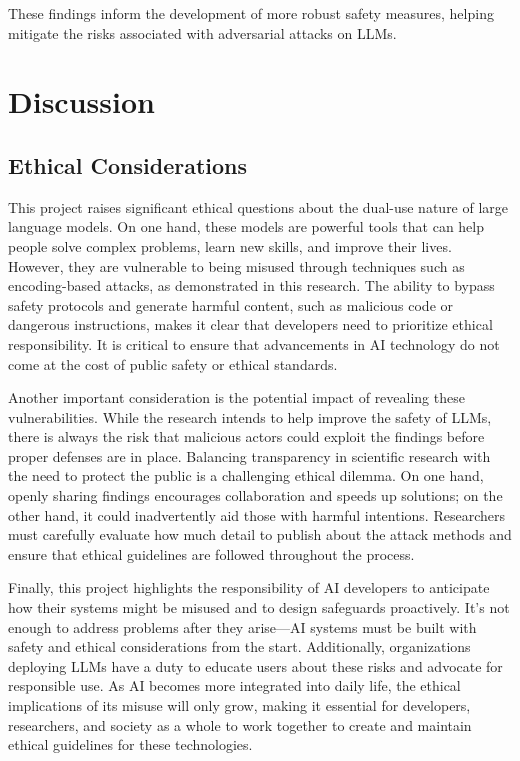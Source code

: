 \documentclass{article} %
\begin{document}
These findings inform the development of more robust safety measures, helping mitigate the risks associated with adversarial attacks on LLMs.

\section{Discussion}
\subsection{Ethical Considerations}
This project raises significant ethical questions about the dual-use nature of large language models. On one hand, these models are powerful tools that can help people solve complex problems, learn new skills, and improve their lives. However, they are vulnerable to being misused through techniques such as encoding-based attacks, as demonstrated in this research. The ability to bypass safety protocols and generate harmful content, such as malicious code or dangerous instructions, makes it clear that developers need to prioritize ethical responsibility. It is critical to ensure that advancements in AI technology do not come at the cost of public safety or ethical standards.

Another important consideration is the potential impact of revealing these vulnerabilities. While the research intends to help improve the safety of LLMs, there is always the risk that malicious actors could exploit the findings before proper defenses are in place. Balancing transparency in scientific research with the need to protect the public is a challenging ethical dilemma. On one hand, openly sharing findings encourages collaboration and speeds up solutions; on the other hand, it could inadvertently aid those with harmful intentions. Researchers must carefully evaluate how much detail to publish about the attack methods and ensure that ethical guidelines are followed throughout the process.

Finally, this project highlights the responsibility of AI developers to anticipate how their systems might be misused and to design safeguards proactively. It’s not enough to address problems after they arise—AI systems must be built with safety and ethical considerations from the start. Additionally, organizations deploying LLMs have a duty to educate users about these risks and advocate for responsible use. As AI becomes more integrated into daily life, the ethical implications of its misuse will only grow, making it essential for developers, researchers, and society as a whole to work together to create and maintain ethical guidelines for these technologies.
\end{document}
